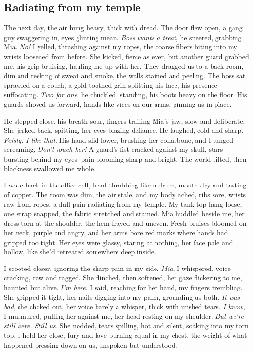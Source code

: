 \documentclass[12pt,oneside]{book} %
\begin{document}
\subsection*{Radiating from my temple}

The next day, the air hung heavy, thick with dread. The door flew open, a gang guy swaggering in, eyes glinting mean. \textit{Boss wants a treat}, he sneered, grabbing Mia. \textit{No!} I yelled, thrashing against my ropes, the coarse fibers biting into my wrists loosened from before. She kicked, fierce as ever, but another guard grabbed me, his grip bruising, hauling me up with her. They dragged us to a back room, dim and reeking of sweat and smoke, the walls stained and peeling. The boss sat sprawled on a couch, a gold-toothed grin splitting his face, his presence suffocating. \textit{Two for one}, he chuckled, standing, his boots heavy on the floor. His guards shoved us forward, hands like vices on our arms, pinning us in place.

He stepped close, his breath sour, fingers trailing Mia’s jaw, slow and deliberate. She jerked back, spitting, her eyes blazing defiance. He laughed, cold and sharp. \textit{Feisty. I like that}. His hand slid lower, brushing her collarbone, and I lunged, screaming, \textit{Don’t touch her!} A guard’s fist cracked against my skull, stars bursting behind my eyes, pain blooming sharp and bright. The world tilted, then blackness swallowed me whole.

I woke back in the office cell, head throbbing like a drum, mouth dry and tasting of copper. The room was dim, the air stale, and my body ached, ribs sore, wrists raw from ropes, a dull pain radiating from my temple. My tank top hung loose, one strap snapped, the fabric stretched and stained. Mia huddled beside me, her dress torn at the shoulder, the hem frayed and uneven. Fresh bruises bloomed on her neck, purple and angry, and her arms bore red marks where hands had gripped too tight. Her eyes were glassy, staring at nothing, her face pale and hollow, like she’d retreated somewhere deep inside.

I scooted closer, ignoring the sharp pain in my side. \textit{Mia}, I whispered, voice cracking, raw and ragged. She flinched, then softened, her gaze flickering to me, haunted but alive. \textit{I’m here}, I said, reaching for her hand, my fingers trembling. She gripped it tight, her nails digging into my palm, grounding us both. \textit{It was bad}, she choked out, her voice barely a whisper, thick with unshed tears. \textit{I know}, I murmured, pulling her against me, her head resting on my shoulder. \textit{But we’re still here. Still us.} She nodded, tears spilling, hot and silent, soaking into my torn top. I held her close, fury and love burning equal in my chest, the weight of what happened pressing down on us, unspoken but understood.
\end{document}
